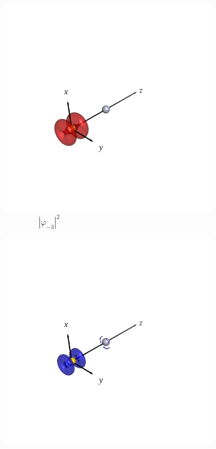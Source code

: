 \documentclass[journal=inoraj,manuscript=article]{achemso}
\begin{document}
\begin{figure}[!h]
    \vspace{0.0cm}
    \begin{subfigure}[t]{0.30\textwidth}
        \centering
        \includegraphics[width=\linewidth]{./AuHg+/nocv-5.png} 
        \caption*{\ \ \ \ \ \ \ \ $|\varphi_{-3}|^2$} 
    \end{subfigure}
    \hfill
    \begin{subfigure}[t]{0.30\textwidth}
        \centering
        \includegraphics[width=\linewidth]{./AuHg+/nocv+5.png} 

\end{subfigure}
\end{figure}
\end{document}
